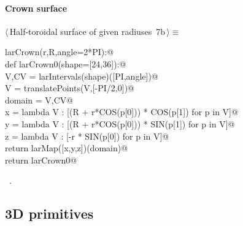 \documentclass[11pt,oneside]{article}	%
\begin{document}
\paragraph{Crown surface}
\begin{flushleft} \small \label{scrap12}
\protect{}$\langle\,$Half-toroidal surface of given radiuses\nobreak\ {\footnotesize 7b}$\,\rangle\equiv$
\vspace{-1ex}
\begin{list}{}{} \item
\mbox{}\verb@def larCrown(r,R,angle=2*PI):@\\
\mbox{}\verb@   def larCrown0(shape=[24,36]):@\\
\mbox{}\verb@      V,CV = larIntervals(shape)([PI,angle])@\\
\mbox{}\verb@      V = translatePoints(V,[-PI/2,0])@\\
\mbox{}\verb@      domain = V,CV@\\
\mbox{}\verb@      x = lambda V : [(R + r*COS(p[0])) * COS(p[1]) for p in V]@\\
\mbox{}\verb@      y = lambda V : [(R + r*COS(p[0])) * SIN(p[1]) for p in V]@\\
\mbox{}\verb@      z = lambda V : [-r * SIN(p[0]) for p in V]@\\
\mbox{}\verb@      return larMap([x,y,z])(domain)@\\
\mbox{}\verb@   return larCrown0@\\
\mbox{}\verb@@{\NWsep}
\end{list}
\vspace{-1ex}
\footnotesize\addtolength{\baselineskip}{-1ex}
\begin{list}{}{\setlength{\itemsep}{-\parsep}\setlength{\itemindent}{-\leftmargin}}
\item \NWtxtMacroRefIn\ .
\end{list}
\end{flushleft}

\subsection{3D primitives}
\end{document}
